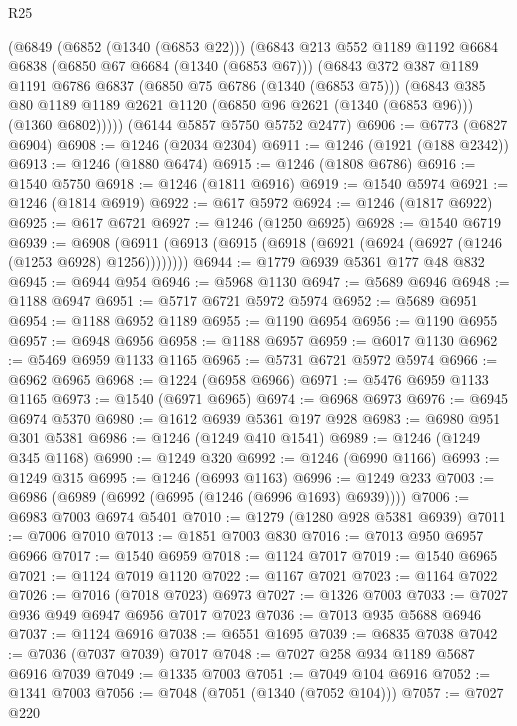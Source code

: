 \begin{lexlean}{R25}
\begin{coremodule}
    (@6849
      (@6852 (@1340 (@6853 @22)))
      (@6843
        @213
        @552
        @1189
        @1192
        @6684
        @6838
        (@6850 @67 @6684 (@1340 (@6853 @67)))
        (@6843
          @372
          @387
          @1189
          @1191
          @6786
          @6837
          (@6850 @75 @6786 (@1340 (@6853 @75)))
          (@6843
            @385
            @80
            @1189
            @1189
            @2621
            @1120
            (@6850 @96 @2621 (@1340 (@6853 @96)))
            (@1360 @6802)))))
    (@6144 @5857 @5750 @5752 @2477)
@6906 := @6773 (@6827 @6904)
@6908 := @1246 (@2034 @2304)
@6911 := @1246 (@1921 (@188 @2342))
@6913 := @1246 (@1880 @6474)
@6915 := @1246 (@1808 @6786)
@6916 := @1540 @5750
@6918 := @1246 (@1811 @6916)
@6919 := @1540 @5974
@6921 := @1246 (@1814 @6919)
@6922 := @617 @5972
@6924 := @1246 (@1817 @6922)
@6925 := @617 @6721
@6927 := @1246 (@1250 @6925)
@6928 := @1540 @6719
@6939 := @6908 (@6911 (@6913 (@6915 (@6918 (@6921 (@6924 (@6927 (@1246 (@1253 @6928) @1256))))))))
@6944 := @1779 @6939 @5361 @177 @48 @832
@6945 := @6944 @954
@6946 := @5968 @1130
@6947 := @5689 @6946
@6948 := @1188 @6947
@6951 := @5717 @6721 @5972 @5974
@6952 := @5689 @6951
@6954 := @1188 @6952 @1189
@6955 := @1190 @6954
@6956 := @1190 @6955
@6957 := @6948 @6956
@6958 := @1188 @6957
@6959 := @6017 @1130
@6962 := @5469 @6959 @1133 @1165
@6965 := @5731 @6721 @5972 @5974
@6966 := @6962 @6965
@6968 := @1224 (@6958 @6966)
@6971 := @5476 @6959 @1133 @1165
@6973 := @1540 (@6971 @6965)
@6974 := @6968 @6973
@6976 := @6945 @6974 @5370
@6980 := @1612 @6939 @5361 @197 @928
@6983 := @6980 @951 @301 @5381
@6986 := @1246 (@1249 @410 @1541)
@6989 := @1246 (@1249 @345 @1168)
@6990 := @1249 @320
@6992 := @1246 (@6990 @1166)
@6993 := @1249 @315
@6995 := @1246 (@6993 @1163)
@6996 := @1249 @233
@7003 := @6986 (@6989 (@6992 (@6995 (@1246 (@6996 @1693) @6939))))
@7006 := @6983 @7003 @6974 @5401
@7010 := @1279 (@1280 @928 @5381 @6939)
@7011 := @7006 @7010
@7013 := @1851 @7003 @830
@7016 := @7013 @950 @6957 @6966
@7017 := @1540 @6959
@7018 := @1124 @7017
@7019 := @1540 @6965
@7021 := @1124 @7019 @1120
@7022 := @1167 @7021
@7023 := @1164 @7022
@7026 := @7016 (@7018 @7023) @6973
@7027 := @1326 @7003
@7033 := @7027 @936 @949 @6947 @6956 @7017 @7023
@7036 := @7013 @935 @5688 @6946
@7037 := @1124 @6916
@7038 := @6551 @1695
@7039 := @6835 @7038
@7042 := @7036 (@7037 @7039) @7017
@7048 := @7027 @258 @934 @1189 @5687 @6916 @7039
@7049 := @1335 @7003
@7051 := @7049 @104 @6916
@7052 := @1341 @7003
@7056 := @7048 (@7051 (@1340 (@7052 @104)))
@7057 := @7027 @220

\end{coremodule}
\end{lexlean}
